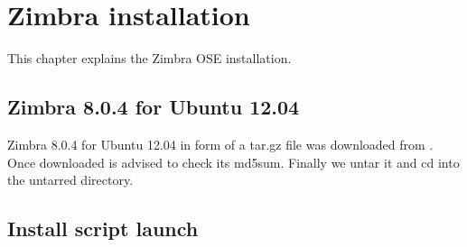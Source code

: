 

\chapter{Zimbra installation}
This chapter explains the Zimbra OSE installation.

\section {Zimbra 8.0.4 for Ubuntu 12.04}
Zimbra 8.0.4 for Ubuntu 12.04 in form of a tar.gz file was downloaded from \cite{Zimbra8Download}.
Once downloaded is advised to check its md5sum. Finally we untar it and cd into the untarred directory.

\section {Install script launch}


